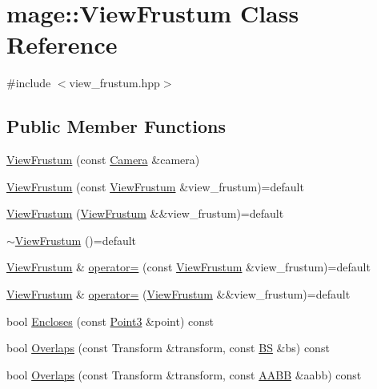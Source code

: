 \hypertarget{classmage_1_1_view_frustum}{}\section{mage\+:\+:View\+Frustum Class Reference}
\label{classmage_1_1_view_frustum}


{\ttfamily \#include $<$view\+\_\+frustum.\+hpp$>$}

\subsection*{Public Member Functions}
\begin{DoxyCompactItemize}
\item 
\hyperlink{classmage_1_1_view_frustum_ad1fd4a59f6cd0fd38289e66d4c6b5d51}{View\+Frustum} (const \hyperlink{classmage_1_1_camera}{Camera} \&camera)
\item 
\hyperlink{classmage_1_1_view_frustum_abbd4ec6c2766d3f630bce16cefa8bc4d}{View\+Frustum} (const \hyperlink{classmage_1_1_view_frustum}{View\+Frustum} \&view\+\_\+frustum)=default
\item 
\hyperlink{classmage_1_1_view_frustum_a3568cfa6a5d440455867eb11b88a5213}{View\+Frustum} (\hyperlink{classmage_1_1_view_frustum}{View\+Frustum} \&\&view\+\_\+frustum)=default
\item 
\hyperlink{classmage_1_1_view_frustum_aaa0e10f5401370909694e923c58323a9}{$\sim$\+View\+Frustum} ()=default
\item 
\hyperlink{classmage_1_1_view_frustum}{View\+Frustum} \& \hyperlink{classmage_1_1_view_frustum_add514821f691117c0ab139c13f86ef70}{operator=} (const \hyperlink{classmage_1_1_view_frustum}{View\+Frustum} \&view\+\_\+frustum)=default
\item 
\hyperlink{classmage_1_1_view_frustum}{View\+Frustum} \& \hyperlink{classmage_1_1_view_frustum_a0167f34c3ba505155ed6064c6d98a99c}{operator=} (\hyperlink{classmage_1_1_view_frustum}{View\+Frustum} \&\&view\+\_\+frustum)=default
\item 
bool \hyperlink{classmage_1_1_view_frustum_a290ee7b311278ed4701203859773aa42}{Encloses} (const \hyperlink{structmage_1_1_point3}{Point3} \&point) const
\item 
bool \hyperlink{classmage_1_1_view_frustum_ab45ef542b3bacf16390a8f223472bcd5}{Overlaps} (const Transform \&transform, const \hyperlink{structmage_1_1_b_s}{BS} \&bs) const
\item 
bool \hyperlink{classmage_1_1_view_frustum_a302c7b49592bc9e5a297270da0c8b6ec}{Overlaps} (const Transform \&transform, const \hyperlink{structmage_1_1_a_a_b_b}{A\+A\+BB} \&aabb) const
\end{DoxyCompactItemize}
